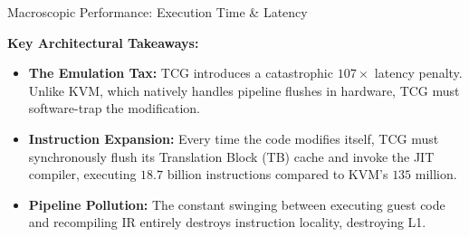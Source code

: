 \documentclass[aspectratio=169]{beamer} %
\begin{document}
  \begin{frame}{Macroscopic Performance: Execution Time \& Latency}
    
    \begin{table}[]
        \centering
        \renewcommand{\arraystretch}{1.3} %
    \end{table}

    \vspace{0.1cm}
    \textbf{Key Architectural Takeaways:}
    \begin{itemize}
        \item \textbf{The Emulation Tax:} TCG introduces a catastrophic $107\times$ latency penalty. Unlike KVM, which natively handles pipeline flushes in hardware, TCG must software-trap the modification.
        \item \textbf{Instruction Expansion:} Every time the code modifies itself, TCG must synchronously flush its Translation Block (TB) cache and invoke the JIT compiler, executing $18.7$ billion instructions compared to KVM's $135$ million.
        \item \textbf{Pipeline Pollution:} The constant swinging between executing guest code and recompiling IR entirely destroys instruction locality, destroying L1.
    \end{itemize}
  \end{frame}
\end{document}
